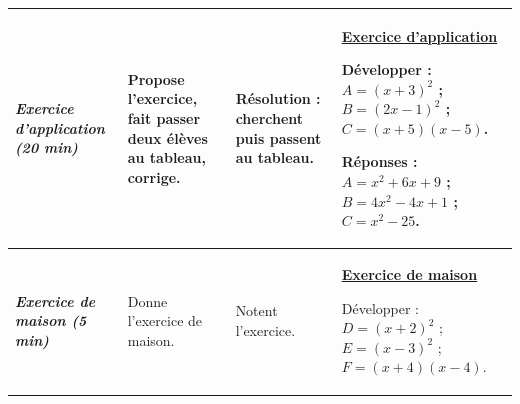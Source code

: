 \documentclass[10pt]{article}
\newcommand{\titreR}[1]{\underline{\textcolor{rougetitre}{\bfseries #1}}}
\newcommand{\app}{\titreR{Exercice d'application}}
\newcommand{\maison}{\underline{\textcolor{rougemaison}{\bfseries Exercice de maison}}}
\newcommand{\moment}[1]{\textbf{\itshape #1}}
\begin{document}
\begin{longtable}{|p{2.35cm}|p{5.35cm}|p{4.55cm}|p{13.85cm}|}
\moment{Exercice d'application (20 min)} &
Propose l'exercice, fait passer deux élèves au tableau, corrige. &
\textbf{Résolution} : cherchent puis passent au tableau. &
\app \par
Développer : \; $A=(x+3)^2$ ; \; $B=(2x-1)^2$ ; \; $C=(x+5)(x-5)$. \par
\textbf{Réponses :} $A=x^2+6x+9$ ; \; $B=4x^2-4x+1$ ; \; $C=x^2-25$. \\ \hline

\moment{Exercice de maison (5 min)} &
Donne l'exercice de maison. &
Notent l'exercice. &
\maison \par
Développer : \; $D=(x+2)^2$ ; \; $E=(x-3)^2$ ; \; $F=(x+4)(x-4)$. \\ \hline
\end{longtable}

\end{document}
